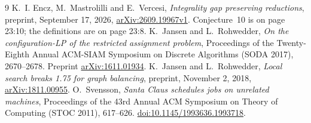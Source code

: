 \documentclass[11pt]{article}
\theoremstyle{remark}
\begin{document}
\begin{thebibliography}{9}
K.~I. Encz, M.~Mastrolilli and E.~Vercesi,
\emph{Integrality gap preserving reductions},
preprint, September 17, 2026,
\href{https://arxiv.org/abs/2609.19967v1}{arXiv:2609.19967v1}.
Conjecture~10 is on page 23:10; the definitions are on page 23:8.
K.~Jansen and L.~Rohwedder,
\emph{On the configuration-LP of the restricted assignment problem},
Proceedings of the Twenty-Eighth Annual ACM-SIAM Symposium on Discrete
Algorithms (SODA 2017), 2670--2678.
Preprint \href{https://arxiv.org/abs/1611.01934}{arXiv:1611.01934}.
K.~Jansen and L.~Rohwedder,
\emph{Local search breaks 1.75 for graph balancing},
preprint, November 2, 2018,
\href{https://arxiv.org/abs/1811.00955}{arXiv:1811.00955}.
O.~Svensson,
\emph{Santa Claus schedules jobs on unrelated machines},
Proceedings of the 43rd Annual ACM Symposium on Theory of Computing
(STOC 2011), 617--626.
\href{https://doi.org/10.1145/1993636.1993718}{doi:10.1145/1993636.1993718}.
\end{thebibliography}
\end{document}
